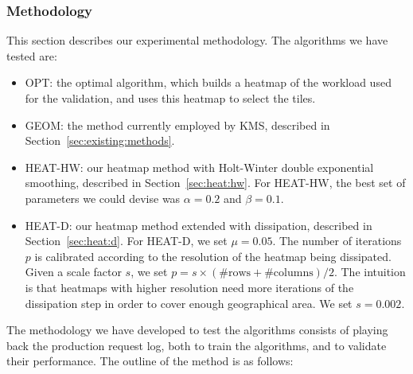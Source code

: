 \documentclass[11pt, oneside]{report}
\begin{document}
{\subsubsection{Methodology}
\label{sec:methods}

This section describes our experimental methodology. The algorithms we have tested are:

\begin{itemize}

\item OPT: the optimal algorithm, which builds a heatmap of the workload used for the validation, and uses this heatmap to select the tiles. 

\item GEOM: the method currently employed by KMS, described in Section~\ref{sec:existing:methods}.

\item HEAT-HW: our heatmap method with Holt-Winter double exponential smoothing, described in Section~\ref{sec:heat:hw}. For HEAT-HW, the best set of parameters we could devise was $\alpha = 0.2$ and $\beta = 0.1$. 

\item HEAT-D: our heatmap method extended with dissipation, described in Section~\ref{sec:heat:d}. For HEAT-D, we set $\mu = 0.05$. The number of iterations $p$ is calibrated according to the resolution of the heatmap being dissipated. Given a scale factor $s$, we set $p = s \times (\text{\#rows}+\text{\#columns})/2$. The intuition is that heatmaps with higher resolution need more iterations of the dissipation step in order to cover enough geographical area. We set $s = 0.002$. 

\end{itemize}

The methodology we have developed to test the algorithms consists of playing back the production request log, both to train the algorithms, and to validate their performance. The outline of the method is as follows:

}
\end{document}
